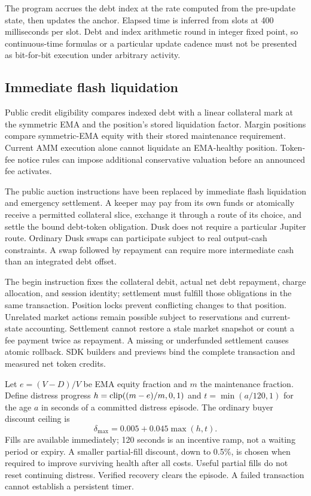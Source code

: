 The program accrues the debt index at the rate computed from the pre-update state, then updates the anchor. Elapsed time is inferred from slots at 400 milliseconds per slot. Debt and index arithmetic round in integer fixed point, so continuous-time formulas or a particular update cadence must not be presented as bit-for-bit execution under arbitrary activity.

\subsection{Immediate flash liquidation}
\label{sec:flash}

Public credit eligibility compares indexed debt with a linear collateral mark at the symmetric EMA and the position's stored liquidation factor. Margin positions compare symmetric-EMA equity with their stored maintenance requirement. Current AMM execution alone cannot liquidate an EMA-healthy position. Token-fee notice rules can impose additional conservative valuation before an announced fee activates.

The public auction instructions have been replaced by immediate flash liquidation and emergency settlement. A keeper may pay from its own funds or atomically receive a permitted collateral slice, exchange it through a route of its choice, and settle the bound debt-token obligation. Dusk does not require a particular Jupiter route. Ordinary Dusk swaps can participate subject to real output-cash constraints. A swap followed by repayment can require more intermediate cash than an integrated debt offset.

The begin instruction fixes the collateral debit, actual net debt repayment, charge allocation, and session identity; settlement must fulfill those obligations in the same transaction. Position locks prevent conflicting changes to that position. Unrelated market actions remain possible subject to reservations and current-state accounting. Settlement cannot restore a stale market snapshot or count a fee payment twice as repayment. A missing or underfunded settlement causes atomic rollback. SDK builders and previews bind the complete transaction and measured net token credits.

Let $e=(V-D)/V$ be EMA equity fraction and $m$ the maintenance fraction. Define distress progress $h=\operatorname{clip}((m-e)/m,0,1)$ and $t=\min(a/120,1)$ for the age $a$ in seconds of a committed distress episode. The ordinary buyer discount ceiling is
\begin{equation}
\delta_{\max}=0.005+0.045\max(h,t).
\label{eq:flash-discount}
\end{equation}
Fills are available immediately; 120 seconds is an incentive ramp, not a waiting period or expiry. A smaller partial-fill discount, down to 0.5\%, is chosen when required to improve surviving health after all costs. Useful partial fills do not reset continuing distress. Verified recovery clears the episode. A failed transaction cannot establish a persistent timer.


